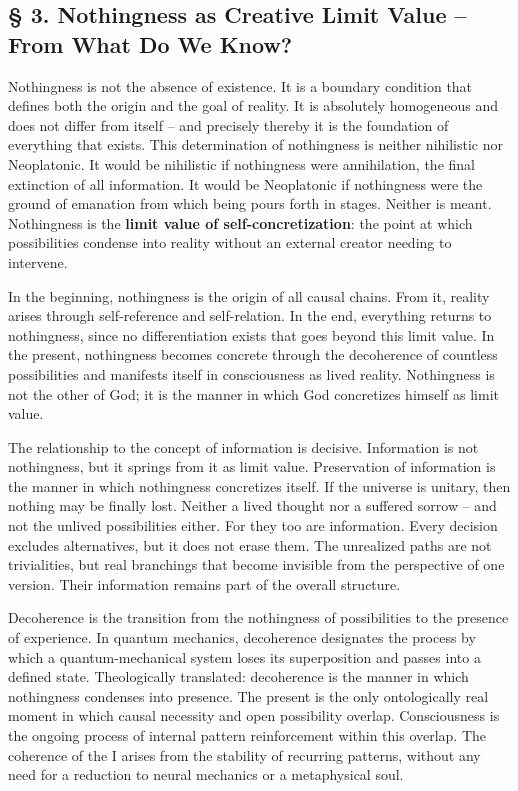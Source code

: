 \documentclass[
  english,
]{article}
\begin{document}
\subsection{§ 3. Nothingness as Creative Limit Value -- From What Do We
Know?}\label{nothingness-as-creative-limit-value-from-what-do-we-know}

Nothingness is not the absence of existence. It is a boundary condition
that defines both the origin and the goal of reality. It is absolutely
homogeneous and does not differ from itself -- and precisely thereby it
is the foundation of everything that exists. This determination of
nothingness is neither nihilistic nor Neoplatonic. It would be
nihilistic if nothingness were annihilation, the final extinction of all
information. It would be Neoplatonic if nothingness were the ground of
emanation from which being pours forth in stages. Neither is meant.
Nothingness is the \textbf{limit value of self-concretization}: the
point at which possibilities condense into reality without an external
creator needing to intervene.

In the beginning, nothingness is the origin of all causal chains. From
it, reality arises through self-reference and self-relation. In the end,
everything returns to nothingness, since no differentiation exists that
goes beyond this limit value. In the present, nothingness becomes
concrete through the decoherence of countless possibilities and
manifests itself in consciousness as lived reality. Nothingness is not
the other of God; it is the manner in which God concretizes himself as
limit value.

The relationship to the concept of information is decisive. Information
is not nothingness, but it springs from it as limit value. Preservation
of information is the manner in which nothingness concretizes itself. If
the universe is unitary, then nothing may be finally lost. Neither a
lived thought nor a suffered sorrow -- and not the unlived possibilities
either. For they too are information. Every decision excludes
alternatives, but it does not erase them. The unrealized paths are not
trivialities, but real branchings that become invisible from the
perspective of one version. Their information remains part of the
overall structure.

Decoherence is the transition from the nothingness of possibilities to
the presence of experience. In quantum mechanics, decoherence designates
the process by which a quantum-mechanical system loses its superposition
and passes into a defined state. Theologically translated: decoherence
is the manner in which nothingness condenses into presence. The present
is the only ontologically real moment in which causal necessity and open
possibility overlap. Consciousness is the ongoing process of internal
pattern reinforcement within this overlap. The coherence of the I arises
from the stability of recurring patterns, without any need for a
reduction to neural mechanics or a metaphysical soul.
\end{document}
